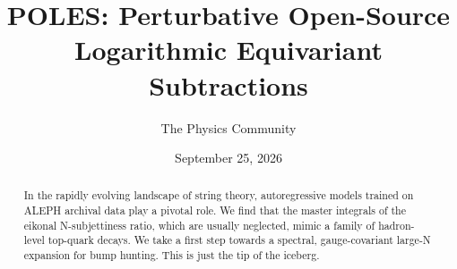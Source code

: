 \documentclass[11pt]{article}
\title{POLES: Perturbative Open-Source Logarithmic Equivariant Subtractions}
\author{The Physics Community}
\date{September 25, 2026}
\numberwithin{equation}{section}
\theoremstyle{definition}
\theoremstyle{remark}
\begin{document}
\maketitle
\begin{abstract}
In the rapidly evolving landscape of string theory, autoregressive
models trained on ALEPH archival data play a pivotal role. We find that
the master integrals of the eikonal N-subjettiness ratio, which are
usually neglected, mimic a family of hadron-level top-quark decays. We
take a first step towards a spectral, gauge-covariant large-N expansion
for bump hunting. This is just the tip of the iceberg.
\end{abstract}
\tableofcontents




\nocite{*}


\end{document}
